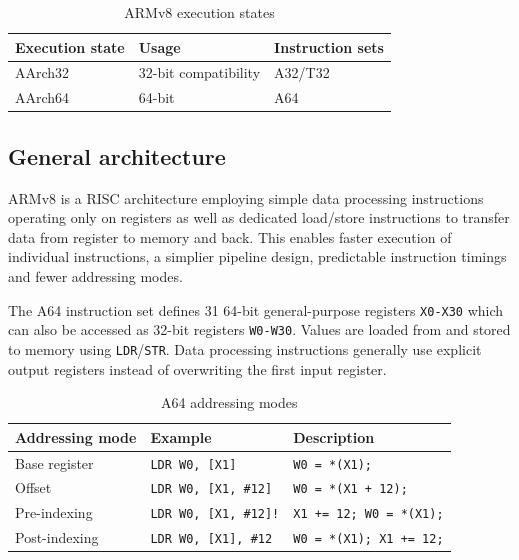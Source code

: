 \begin{table}[h!]
    \centering
    \caption{ARMv8 execution states}
    \begin{tabularx}{\textwidth}{llX}
        \toprule
        Execution state & Usage & Instruction sets \\
        \midrule
        AArch32 & 32-bit compatibility & A32/T32 \\
        AArch64 & 64-bit & A64 \\
        \bottomrule
    \end{tabularx}
\end{table}

\subsection{General architecture}

ARMv8 is a RISC architecture employing simple data processing instructions
operating only on registers as well as dedicated load/store instructions to
transfer data from register to memory and back. This enables faster execution
of individual instructions, a simplier pipeline design, predictable instruction
timings and fewer addressing modes.

The A64 instruction set defines 31 64-bit general-purpose registers
\texttt{X0-X30} which can also be accessed as 32-bit registers \texttt{W0-W30}.
Values are loaded from and stored to memory using \texttt{LDR}/\texttt{STR}.
Data processing instructions generally use explicit output registers instead of
overwriting the first input register.

\begin{table}[h!]
    \centering
    \small
    \caption{A64 addressing modes}
    \begin{tabularx}{\textwidth}{llX}
        \toprule
        Addressing mode & Example & Description \\
        \midrule
        Base register & \texttt{LDR W0, [X1]} & \texttt{W0 = *(X1);} \\
        Offset & \texttt{LDR W0, [X1, \#12]} & \texttt{W0 = *(X1 + 12);} \\
        Pre-indexing & \texttt{LDR W0, [X1, \#12]!} & \texttt{X1 += 12; W0 = *(X1);} \\
        Post-indexing & \texttt{LDR W0, [X1], \#12} & \texttt{W0 = *(X1); X1 += 12;} \\
        \bottomrule
    \end{tabularx}
\end{table}

